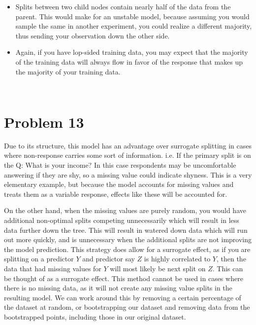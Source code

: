 \documentclass[11pt]{article}
\begin{document}
\begin{itemize}
\item Splits between two child nodes contain nearly half of the data from the 
parent. This would make for an unstable model, because assuming you would 
sample the same in another experiment, you could realize a different majority, 
thus sending your observation down the other side.
\item Again, if you have lop-sided training data, you may expect that the 
majority of the training data will always flow in favor of the response that 
makes up the majority of your training data.
\end{itemize}
\newpage
\begin{center}
\ \\
\end{center}

\section*{Problem 13}

\vspace{5 mm}
\noindent
Due to its structure, this model has an advantage over surrogate splitting in 
cases where non-response carries some sort of information.  i.e. If the primary 
split is on the Q: What is your income? In this case respondents may be 
uncomfortable answering if they are shy, so a missing value could indicate 
shyness.  This is a very elementary example, but because the model accounts for 
missing values and treats them as a variable response, effects like these will 
be accounted for.  

\vspace{5 mm}
\noindent
On the other hand, when the missing values are purely random, you would have 
additional non-optimal splits competing unnecessarily which will result in less 
data further down the tree.  This will result in watered down data which will 
run out more quickly, and is unnecessary when the additional splits are not 
improving the model prediction.  This strategy does allow for a surrogate 
effect, as if you are splitting on a predictor $Y$ and predictor say  $Z$ is 
highly correlated to $Y$, then the data that had missing values for $Y$ will 
most likely be next split on $Z$.  This can be thought of as a surrogate effect.  
This method cannot be used in cases where there is no missing data, as it will 
not create any missing value splits in the resulting model.  We can work around 
this by removing a certain percentage of the dataset at random, or 
bootstrapping our dataset and removing data from the bootstrapped points, 
including those in our original dataset.
\end{document}
